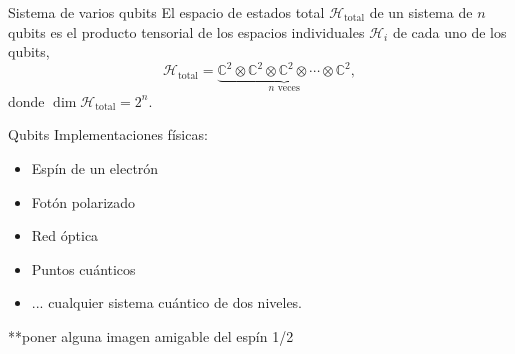 \documentclass[11pt]{beamer}
\begin{document}
\begin{frame}{Sistema de varios qubits}
	\vfill
	El espacio de estados total $\mathcal{H}_\text{total}$ de un sistema de 
	$n$ qubits es
	el producto tensorial de los espacios individuales $\mathcal{H}_i$
	de cada uno de 	los qubits,
	\begin{equation}
		\mathcal{H}_{\text{total}} = \underbrace{\mathbb{C}^2 \otimes 
		\mathbb{C}^2 \otimes \mathbb{C}^2 \otimes 
		\cdots \otimes \mathbb{C}^2}_{n \text{ veces}},
	\end{equation}
	donde $\dim \mathcal{H}_{\text{total}} = 2^n$. \vfill
\end{frame}

\begin{frame}{Qubits}
Implementaciones físicas:
\begin{itemize}
	\item Espín de un electrón
	\item Fotón polarizado
	\item Red óptica
	\item Puntos cuánticos
	\item ... cualquier sistema cuántico de dos niveles.
\end{itemize}\vfill

**poner alguna imagen amigable del espín 1/2
\end{frame}
\end{document}
